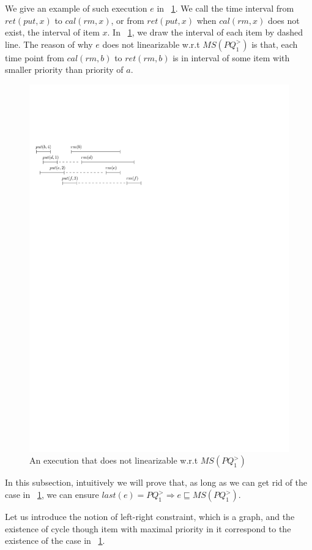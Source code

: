 We give an example of such execution $e$ in \figurename~\ref{fig:introduce gap for PQ1Lar}. We call the time interval from $\textit{ret}(\textit{put},x)$ to $\textit{cal}(rm,x)$, or from $\textit{ret}(\textit{put},x)$ when $\textit{cal}(rm,x)$ does not exist, the interval of item $x$. In \figurename~\ref{fig:introduce gap for PQ1Lar}, we draw the interval of each item by dashed line. The reason of why $e$ does not linearizable w.r.t $\textit{MS}(\textit{PQ}_1^{>})$ is that, each time point from $\textit{cal}(\textit{rm},b)$ to $\textit{ret}(\textit{rm},b)$ is in interval of some item with smaller priority than priority of $a$.

\begin{figure}[htbp]
  \centering
  \includegraphics[width=0.6 \textwidth]{figures/PIC-HIS-INTRO-GAP-PQ1L.pdf}
  \caption{An execution that does not linearizable w.r.t $\textit{MS}(\textit{PQ}_1^{>})$}
  \label{fig:introduce gap for PQ1Lar}
\end{figure}

In this subsection, intuitively we will prove that, as long as we can get rid of the case in \figurename~\ref{fig:introduce gap for PQ1Lar}, we can ensure $\textit{last}(e) = \textit{PQ}_1^{>} \Rightarrow e \sqsubseteq \textit{MS}(\textit{PQ}_1^{>})$.

Let us introduce the notion of left-right constraint, which is a graph, and the existence of cycle though item with maximal priority in it correspond to the existence of the case in \figurename~\ref{fig:introduce gap for PQ1Lar}.

